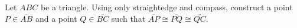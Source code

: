 Let $ABC$ be a triangle.
Using only straightedge and compass,
construct a point $P \in \overline{AB}$
and a point $Q \in \overline{BC}$
such that $\overline{AP} \cong \overline{PQ} \cong \overline{QC}$.

